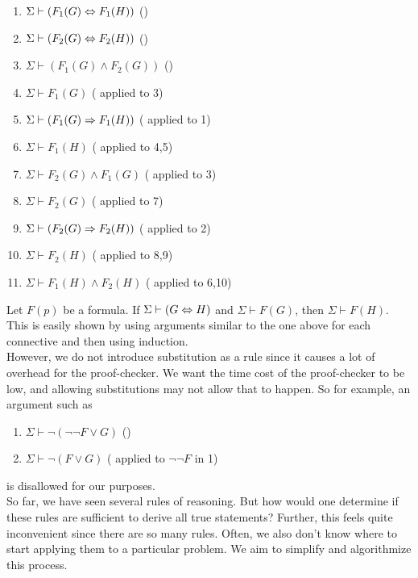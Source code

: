\begin{enumerate}
	\item $\Sigma\vdash (F_1(G)\Leftrightarrow F_1(H))$ \hfill ()
	\item $\Sigma\vdash (F_2(G)\Leftrightarrow F_2(H))$ \hfill ()
	\item $\Sigma\vdash (F_1(G)\land F_2(G))$ \hfill ()
	\item $\Sigma\vdash F_1(G)$ \hfill ( applied to 3)
	\item $\Sigma\vdash (F_1(G)\Rightarrow F_1(H))$ \hfill ( applied to 1)
	\item $\Sigma\vdash F_1(H)$ \hfill ( applied to 4,5)
	\item $\Sigma\vdash F_2(G)\land F_1(G)$ \hfill ( applied to 3)
	\item $\Sigma\vdash F_2(G)$ \hfill ( applied to 7)
	\item $\Sigma\vdash (F_2(G)\Rightarrow F_2(H))$ \hfill ( applied to 2)
	\item $\Sigma\vdash F_2(H)$ \hfill ( applied to 8,9)
	\item $\Sigma\vdash F_1(H)\land F_2(H)$ \hfill ( applied to 6,10)
\end{enumerate}

Let $F(p)$ be a formula. If $\Sigma\vdash (G\Leftrightarrow H)$ and $\Sigma\vdash F(G)$, then $\Sigma\vdash F(H)$.\\
This is easily shown by using arguments similar to the one above for each connective and then using induction.\\

However, we do not introduce substitution as a rule since it causes a lot of overhead for the proof-checker. We want the time cost of the proof-checker to be low, and allowing substitutions may not allow that to happen. So for example, an argument such as
\begin{enumerate}
	\item $\Sigma\vdash \neg(\neg\neg F\lor G)$ \hfill ()
	\item $\Sigma\vdash \neg(F\lor G)$ \hfill ( applied to $\neg\neg F$ in 1)
\end{enumerate}
is disallowed for our purposes.\\

So far, we have seen several rules of reasoning. But how would one determine if these rules are sufficient to derive all true statements? Further, this feels quite inconvenient since there are so many rules. Often, we also don't know where to start applying them to a particular problem. We aim to simplify and algorithmize this process.


